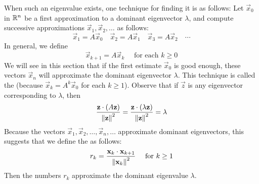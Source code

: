 \documentclass{ximera}
\begin{document}
When such an eigenvalue exists, one technique for finding it is as follows: Let $\vec{x}_{0}$ in $\mathbb{R}^n$ be a first approximation to a dominant eigenvector $\lambda$, and compute successive approximations $\vec{x}_{1}, \vec{x}_{2}, \dots$  as follows:
\begin{equation*}
\vec{x}_{1} = A\vec{x}_{0} \quad \vec{x}_{2} = A\vec{x}_{1} \quad \vec{x}_{3} = A\vec{x}_{2} \quad \cdots
\end{equation*}
In general, we define
\begin{equation*}
\vec{x}_{k+1} = A\vec{x}_{k} \quad \mbox{ for each } k \geq 0
\end{equation*}
We will see in this section that if the first estimate $\vec{x}_{0}$ is good enough, these vectors $\vec{x}_{n}$ will approximate the dominant eigenvector $\lambda$. This technique is called the  (because $\vec{x}_{k} = A^{k}\vec{x}_{0}$ for each $k \geq 1$). Observe that if $\vec{z}$ is any eigenvector corresponding to $\lambda$, then
\begin{equation*}
\frac{\mathbf{z} \cdot (A\mathbf{z})}{\left\lVert \mathbf{z} \right\rVert^2} = \frac{\mathbf{z} \cdot (\lambda\mathbf{z})}{\left\lVert \mathbf{z} \right\rVert^2} = \lambda
\end{equation*}
Because the vectors $\vec{x}_{1}, \vec{x}_{2}, \dots, \vec{x}_{n}, \dots$  approximate dominant eigenvectors, this suggests that we define the  as follows:
\begin{equation*}
r_{k} = \frac{\mathbf{x}_{k} \cdot \mathbf{x}_{k+1}}{\left\lVert \mathbf{x}_{k} \right\rVert^2} \quad \mbox{ for } k \geq 1
\end{equation*}
Then the numbers $r_{k}$ approximate the dominant eigenvalue $\lambda$.
\end{document}
